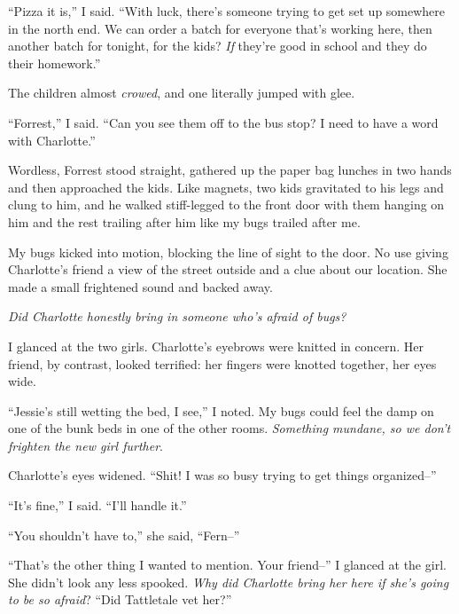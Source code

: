 ``Pizza it is,'' I said.  ``With luck, there's someone trying to get set up somewhere in the north end.  We can order a batch for everyone that's working here, then another batch for tonight, for the kids?  \emph{If} they're good in school and they do their homework.''



The children almost \emph{crowed}, and one literally jumped with glee.



``Forrest,'' I said.  ``Can you see them off to the bus stop?  I need to have a word with Charlotte.''



Wordless, Forrest stood straight, gathered up the paper bag lunches in two hands and then approached the kids.  Like magnets, two kids gravitated to his legs and clung to him, and he walked stiff-legged to the front door with them hanging on him and the rest trailing after him like my bugs trailed after me.



My bugs kicked into motion, blocking the line of sight to the door.  No use giving Charlotte's friend a view of the street outside and a clue about our location.  She made a small frightened sound and backed away.



\emph{Did Charlotte honestly bring in someone who's afraid of bugs?}



I glanced at the two girls.  Charlotte's eyebrows were knitted in concern.  Her friend, by contrast, looked terrified: her fingers were knotted together, her eyes wide.



``Jessie's still wetting the bed, I see,'' I noted.  My bugs could feel the damp on one of the bunk beds in one of the other rooms.  \emph{Something mundane, so we don't frighten the new girl further}.



Charlotte's eyes widened.  ``Shit!  I was so busy trying to get things organized--''



``It's fine,'' I said.  ``I'll handle it.''



``You shouldn't have to,'' she said, ``Fern--''



``That's the other thing I wanted to mention.  Your friend--'' I glanced at the girl.  She didn't look any less spooked.  \emph{Why did Charlotte bring her here if she's going to be so afraid}?  ``Did Tattletale vet her?''



